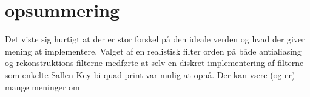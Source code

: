 \section{opsummering}

Det viste sig hurtigt at der er stor forskel på den ideale verden og hvad der giver mening at implementere.
Valget af en realistisk filter orden på både antialiasing og rekonstruktions filterne medførte at selv en diskret implementering af filterne som enkelte Sallen-Key bi-quad print var mulig at opnå.
Der kan være (og er) mange meninger om











  
